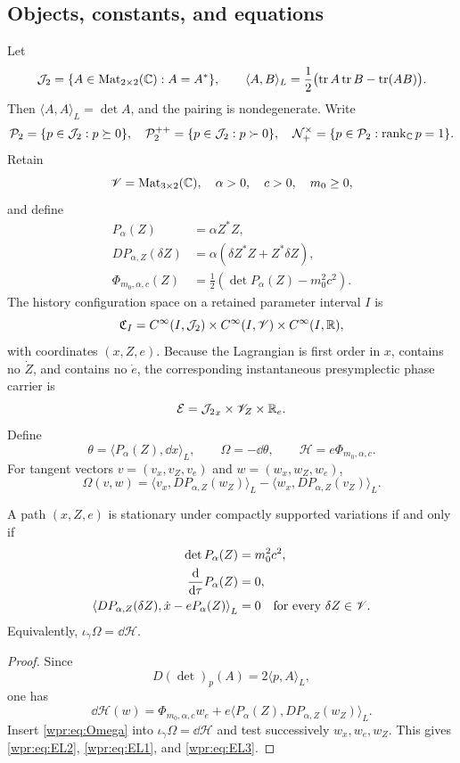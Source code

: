 \subsection{Objects, constants, and equations}
Let
\[
 \mathcal J_2=\{A\in\operatorname{Mat}_{2\times2}(\mathbb C):A=A^*\},
\qquad
 \langle A,B\rangle_L=
 \frac12\bigl(\operatorname{tr}A\operatorname{tr}B-\operatorname{tr}(AB)\bigr).
\]
Then \(\langle A,A\rangle_L=\det A\), and the pairing is nondegenerate.
Write
\[
 \mathcal P_2=\{p\in\mathcal J_2:p\succeq0\},\quad
 \mathcal P_2^{++}=\{p\in\mathcal J_2:p\succ0\},\quad
 \mathcal N_+^\times=\{p\in\mathcal P_2:\operatorname{rank}_{\mathbb C} p=1\}.
\]
Retain
\[
 \mathscr V=\operatorname{Mat}_{3\times2}(\mathbb C),\quad
 \alpha>0,\quad c>0,\quad m_0\geq0,
\]
and define
\begin{align}
 P_\alpha(Z)&=\alpha Z^*Z,\label{wpr:eq:P}\\
 D P_{\alpha,Z}(\delta Z)&=
 \alpha(\delta Z^*Z+Z^*\delta Z),\label{wpr:eq:DP}\\
 \Phi_{m_0,\alpha,c}(Z)&=
 \frac12\left(\det P_\alpha(Z)-m_0^2c^2\right).\label{wpr:eq:Phi}
\end{align}
The history configuration space on a retained parameter interval \(I\) is
\[
 \mathfrak C_I=
 C^\infty(I,\mathcal J_2)\times C^\infty(I,\mathscr V)\times C^\infty(I,\mathbb R),
\]
with coordinates \((x,Z,e)\).  Because the Lagrangian is first order
in \(x\), contains no \(\dot Z\), and contains no \(\dot e\), the
corresponding instantaneous presymplectic phase carrier is
\[
 \mathcal E={\mathcal J_2}_x\times{\mathscr V}_Z\times\mathbb R_e.
\]
Define
\begin{equation}
 \theta=\langle P_\alpha(Z),\dd x\rangle_L,\qquad
 \Omega=-\dd\theta,\qquad
 \mathcal H=e\Phi_{m_0,\alpha,c}.
 \label{wpr:eq:forms}
\end{equation}
For tangent vectors \(v=(v_x,v_Z,v_e)\) and \(w=(w_x,w_Z,w_e)\),
\begin{equation}
 \Omega(v,w)=
 \langle v_x,D P_{\alpha,Z}(w_Z)\rangle_L
 -\langle w_x,D P_{\alpha,Z}(v_Z)\rangle_L.
 \label{wpr:eq:Omega}
\end{equation}

\begin{proposition}
\label{wpr:prop:EL}
A path \((x,Z,e)\) is stationary under compactly supported variations
if and only if
\begin{align}
 \det P_\alpha(Z)&=m_0^2c^2,\label{wpr:eq:EL1}\\
 \frac{\mathrm d}{\mathrm d\tau}P_\alpha(Z)&=0,\label{wpr:eq:EL2}\\
 \left\langle D P_{\alpha,Z}(\delta Z),
 \dot x-eP_\alpha(Z)\right\rangle_L&=0
 \quad\text{for every }\delta Z\in\mathscr V.\label{wpr:eq:EL3}
\end{align}
Equivalently, \(\iota_{\dot\gamma}\Omega=\dd\mathcal H\).
\end{proposition}
\begin{proof}
Since
\[
 D(\det)_p(A)=2\langle p,A\rangle_L,
\]
one has
\[
 \dd\mathcal H(w)=
 \Phi_{m_0,\alpha,c}w_e+
 e\langle P_\alpha(Z),D P_{\alpha,Z}(w_Z)\rangle_L.
\]
Insert \eqref{wpr:eq:Omega} into
\(\iota_{\dot\gamma}\Omega=\dd\mathcal H\) and test successively
\(w_x,w_e,w_Z\).  This gives \eqref{wpr:eq:EL2},
\eqref{wpr:eq:EL1}, and \eqref{wpr:eq:EL3}.
\end{proof}

